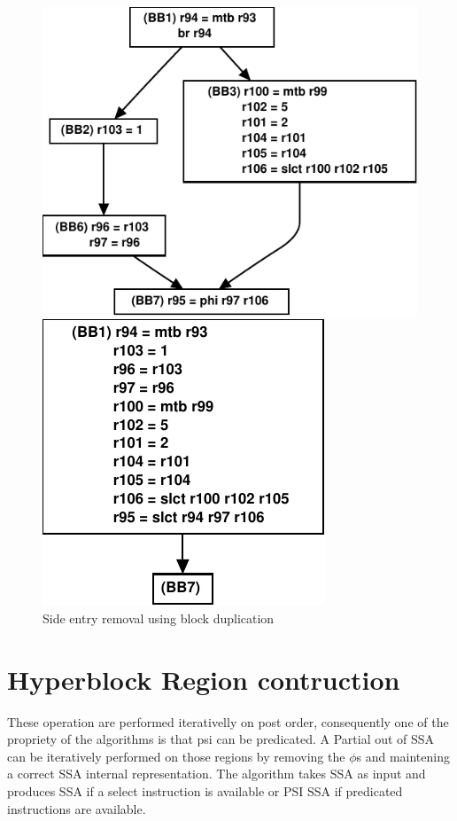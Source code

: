 \begin{figure}[th]
\begin{minipage}[b]{3cm}
\includegraphics[scale=0.3]{g3.pdf}
\end{minipage}
\begin{minipage}[b]{3cm}
\includegraphics[scale=0.3]{g4.pdf}
\end{minipage}
\caption{Side entry removal using block duplication}
\label{fig:bbdup}
\end{figure}

\section{Hyperblock Region contruction}

These operation are performed iterativelly on post order, consequently one of the propriety of the algorithms is that psi can be predicated. A Partial out of SSA can be iteratively performed on those regions by removing the $\phi$s and maintening a correct SSA internal representation. The algorithm takes SSA as input and produces SSA if a select instruction is available or PSI SSA if predicated instructions are available. 


